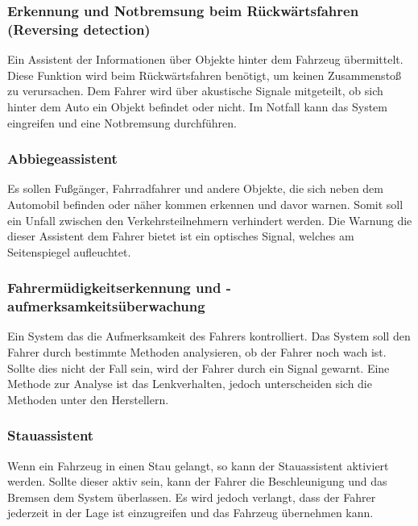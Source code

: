         \subsubsection{Erkennung und Notbremsung beim Rückwärtsfahren (Reversing detection)}
        Ein Assistent der Informationen über Objekte hinter dem Fahrzeug übermittelt. Diese Funktion
        wird beim Rückwärtsfahren benötigt, um keinen Zusammenstoß zu verursachen. Dem Fahrer wird 
        über akustische Signale mitgeteilt, ob sich hinter dem Auto ein Objekt befindet oder nicht.
        Im Notfall kann das System eingreifen und eine Notbremsung durchführen.
        ~\cite{assistenzsysteme.PB2}  ~\cite{reversedetection.PB1}

        \subsubsection{Abbiegeassistent}
        Es sollen Fußgänger, Fahrradfahrer und andere Objekte, die sich neben dem Automobil befinden
        oder näher kommen erkennen und davor warnen. Somit soll ein Unfall zwischen den Verkehrsteilnehmern
        verhindert werden. Die Warnung die dieser Assistent dem Fahrer bietet ist ein optisches Signal,
        welches am Seitenspiegel aufleuchtet.
        ~\cite{assistenzsysteme.PB2} ~\cite{abbiegeassi.PB1} ~\cite{abbiegeassi.PB2}

        \subsubsection{Fahrermüdigkeitserkennung und -aufmerksamkeitsüberwachung}
        Ein System das die Aufmerksamkeit des Fahrers kontrolliert. Das System soll den Fahrer durch
        bestimmte Methoden analysieren, ob der Fahrer noch wach ist. Sollte dies nicht der Fall sein,
        wird der Fahrer durch ein Signal gewarnt. Eine Methode zur Analyse ist das Lenkverhalten, jedoch
        unterscheiden sich die Methoden unter den Herstellern.
        ~\cite{muedigkeitsassi.PB1} ~\cite{assistenzsysteme.PB1}  ~\cite{assistenzsysteme.PB2}
        ~\cite{muedigkeitsassi.PB2}
        
        \subsubsection{Stauassistent}
        Wenn ein Fahrzeug in einen Stau gelangt, so kann der Stauassistent aktiviert werden. Sollte dieser
        aktiv sein, kann der Fahrer die Beschleunigung und das Bremsen dem System überlassen. Es wird
        jedoch verlangt, dass der Fahrer jederzeit in der Lage ist einzugreifen und das Fahrzeug übernehmen
        kann.
        ~\cite{stauassi.PB1} ~\cite{stauassi.PB2}
        
